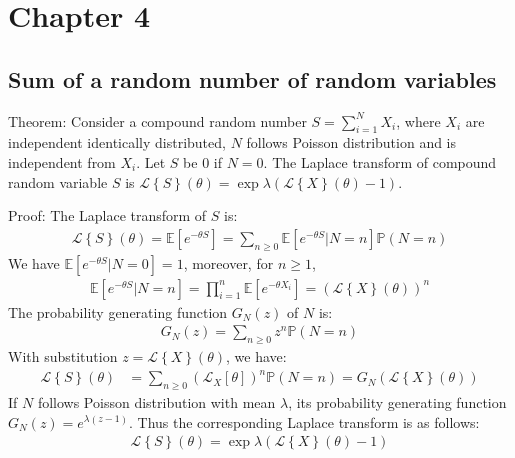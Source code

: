 \chapter{Chapter 4} 
\section*{Sum of a random number of random variables}
\label{annexe:laplace-transform-compound-RV}
Theorem: Consider a compound random number $S=\sum_{i=1}^{N} X_i$, where $X_i$ are independent identically distributed, $N$ follows Poisson distribution and is independent from $X_i$. Let $S$ be $0$ if $N=0$. The Laplace transform of compound random variable $S$ is $\mathcal{L} \left\lbrace S \right\rbrace \left( \theta \right) = \exp{\lambda\left(  \mathcal{L} \left\lbrace X \right\rbrace \left( \theta \right) - 1\right) }$.


Proof: The Laplace transform of $S$ is:
\begin{align*}
\mathcal{L} \left\lbrace S \right\rbrace \left( \theta \right)  = \mathbb{E}\left[ e^{-\theta S}  \right] = \sum_{n \geq 0}  \mathbb{E}\left[ e^ {-\theta S }| N = n\right ] \mathbb{P}\left( N = n\right) 
\end{align*}
We have $\mathbb{E}\left[ e^{-\theta S} | N = 0 \right] = 1$, moreover, for $n \geq 1$,
\begin{align*}
\mathbb{E}\left[ e^ {-\theta S }| N = n\right ] 
= \prod_{i=1}^{n} \mathbb{E}\left[ e^ {-\theta X_i}\right] 
= \left( \mathcal{L} \left\lbrace X \right\rbrace \left( \theta \right)   \right) ^ n
\end{align*}
The probability generating function  $G_N\left( z \right)$ of $N$ is:
\begin{align*}
G_N\left( z \right)  = \sum_{n \geq 0} z^n \mathbb{P}\left( N = n \right) 
\end{align*}
With substitution $z=\mathcal{L} \left\lbrace X \right\rbrace \left( \theta \right)$, we have:
\begin{align*}
\mathcal{L} \left\lbrace S \right\rbrace \left( \theta \right)   &= \sum_{n \geq 0} \left( \mathcal{L}_X\left[ \theta \right] \right) ^ n \mathbb{P}\left( N = n \right) 
= G_N\left(  \mathcal{L} \left\lbrace X \right\rbrace \left( \theta \right)  \right) 
\end{align*}
If $N$ follows Poisson distribution with mean $\lambda$, its probability generating function $G_N\left( z \right) =  e^{\lambda\left( z - 1\right) }$. Thus the corresponding Laplace transform is as follows:
\begin{align}
\label{eq:laplace-transform-comound-RV}
\mathcal{L} \left\lbrace S \right\rbrace \left( \theta \right) = \exp{\lambda\left(  \mathcal{L} \left\lbrace X \right\rbrace \left( \theta \right) - 1\right) } 
\end{align}

